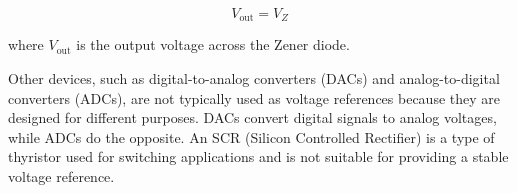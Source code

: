 \[
V_{\text{out}} = V_Z
\]

where \(V_{\text{out}}\) is the output voltage across the Zener diode.

Other devices, such as digital-to-analog converters (DACs) and analog-to-digital converters (ADCs), are not typically used as voltage references because they are designed for different purposes. DACs convert digital signals to analog voltages, while ADCs do the opposite. An SCR (Silicon Controlled Rectifier) is a type of thyristor used for switching applications and is not suitable for providing a stable voltage reference.


